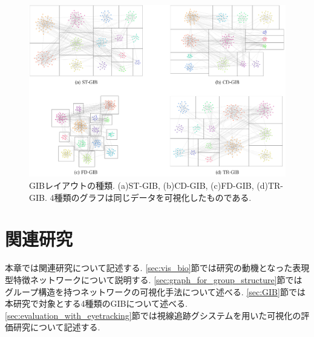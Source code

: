 \documentclass{kuee}
\begin{document}
\begin{figure}
  \centering
  \includegraphics[width=15cm]{./images/examples.png}
  \caption{GIBレイアウトの種類. (a)ST-GIB, (b)CD-GIB, (c)FD-GIB, (d)TR-GIB. 4種類のグラフは同じデータを可視化したものである. \label{fig:example_GIB}}
\end{figure}


\chapter{関連研究}
\label{chap:relatedwork}
本章では関連研究について記述する.
\ref{sec:vis_bio}節では研究の動機となった表現型特徴ネットワークについて説明する.
\ref{sec:graph_for_group_structure}節ではグループ構造を持つネットワークの可視化手法について述べる.
\ref{sec:GIB}節では本研究で対象とする4種類のGIBについて述べる.
\ref{sec:evaluation_with_eyetracking}節では視線追跡グシステムを用いた可視化の評価研究について記述する.
\end{document}
